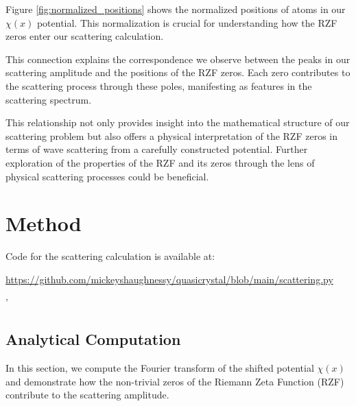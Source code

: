 \documentclass[11pt, oneside]{article}
\begin{document}
Figure \ref{fig:normalized_positions} shows the normalized positions of atoms in our $\chi(x)$ potential. This normalization is crucial for understanding how the RZF zeros enter our scattering calculation.

This connection explains the correspondence we observe between the peaks in our scattering amplitude and the positions of the RZF zeros. Each zero contributes to the scattering process through these poles, manifesting as features in the scattering spectrum.

This relationship not only provides insight into the mathematical structure of our scattering problem but also offers a physical interpretation of the RZF zeros in terms of wave scattering from a carefully constructed potential. Further exploration of the properties of the RZF and its zeros through the lens of physical scattering processes could be beneficial.

\section{Method}

Code for the scattering calculation is available at:
 
\url{https://github.com/mickeyshaughnessy/quasicrystal/blob/main/scattering.py}

'
% 
%

\subsection{Analytical Computation}

In this section, we compute the Fourier transform of the shifted potential $\chi(x)$ and demonstrate how the non-trivial zeros of the Riemann Zeta Function (RZF) contribute to the scattering amplitude.
\end{document}
